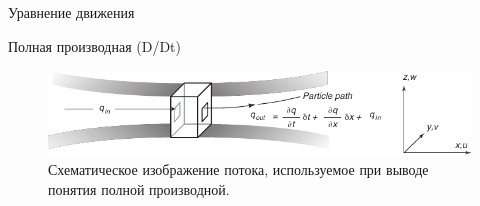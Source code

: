 \begin{chapter}{Уравнение движения}
\begin{section}{Полная производная (D/Dt)}
\begin{figure}[h!]
\includegraphics{pics/derivativesketch}
\caption{Схематическое изображение потока, используемое при выводе понятия
полной производной.}
\label{fig:derivativesketch}
\end{figure}
%
% 


\end{section}
\end{chapter}
